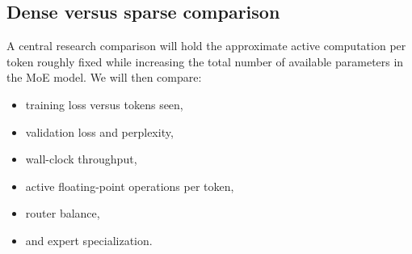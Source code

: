 \documentclass[11pt]{article}
\begin{document}
\subsection{Dense versus sparse comparison}
A central research comparison will hold the approximate active computation per
token roughly fixed while increasing the total number of available parameters in
the MoE model.  We will then compare:
\begin{itemize}[leftmargin=1.5em]
    \item training loss versus tokens seen,
    \item validation loss and perplexity,
    \item wall-clock throughput,
    \item active floating-point operations per token,
    \item router balance,
    \item and expert specialization.
\end{itemize}
\end{document}
